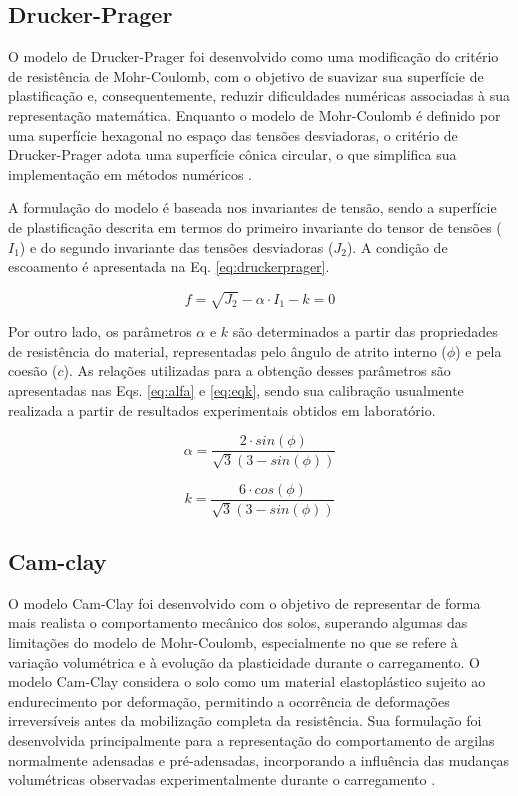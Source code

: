 \subsection{Drucker-Prager}

O modelo de Drucker-Prager foi desenvolvido como uma modificação do critério de resistência de Mohr-Coulomb, com o objetivo de suavizar sua superfície de plastificação e, consequentemente, reduzir dificuldades numéricas associadas à sua representação matemática. Enquanto o modelo de Mohr-Coulomb é definido por uma superfície hexagonal no espaço das tensões desviadoras, o critério de Drucker-Prager adota uma superfície cônica circular, o que simplifica sua implementação em métodos numéricos \cite{robert2015}.  

A formulação do modelo é baseada nos invariantes de tensão, sendo a superfície de plastificação descrita em termos do primeiro invariante do tensor de tensões ($I_1$) e do segundo invariante das tensões desviadoras ($J_2$). A condição de escoamento é apresentada na Eq. \eqref{eq:druckerprager}.

\begin{equation}
	f=\sqrt{J_{2}}-\alpha\cdot I_{1}-k=0
	\label{eq:druckerprager}
\end{equation}

Por outro lado, os parâmetros $\alpha$ e $k$ são determinados a partir das propriedades de resistência do material, representadas pelo ângulo de atrito interno ($\phi$) e pela coesão ($c$). As relações utilizadas para a obtenção desses parâmetros são apresentadas nas Eqs. \eqref{eq:alfa} e \eqref{eq:eqk}, sendo sua calibração usualmente realizada a partir de resultados experimentais obtidos em laboratório.

\begin{equation}
	\alpha=\frac{2\cdot sin(\phi)}{\sqrt{3}(3-sin(\phi))}
	\label{eq:alfa}
\end{equation}

\begin{equation}
	k=\frac{6\cdot cos(\phi)}{\sqrt{3}(3-sin(\phi))}
	\label{eq:eqk}
\end{equation}

\subsection{Cam-clay}

O modelo Cam-Clay foi desenvolvido com o objetivo de representar de forma mais realista o comportamento mecânico dos solos, superando algumas das limitações do modelo de Mohr-Coulomb, especialmente no que se refere à variação volumétrica e à evolução da plasticidade durante o carregamento. O modelo Cam-Clay considera o solo como um material elastoplástico sujeito ao endurecimento por deformação, permitindo a ocorrência de deformações irreversíveis antes da mobilização completa da resistência. Sua formulação foi desenvolvida principalmente para a representação do comportamento de argilas normalmente adensadas e pré-adensadas, incorporando a influência das mudanças volumétricas observadas experimentalmente durante o carregamento \cite{roscoe1958}. 

